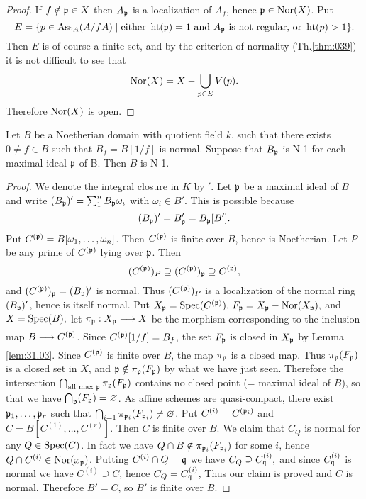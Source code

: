 \documentclass[../main]{subfiles}
\begin{document}
\begin{proof}
If $f \notin \mathfrak{p} \in X$ then $A_{\mathfrak{p}}$ is a localization of $A_{f}$, hence $\mathfrak{p} \in \operatorname{Nor}(X)$. Put \[E=\{p \in \operatorname{Ass}_{A}(A / f A) \mid \text{either }\operatorname{ht}(\mathfrak{p})=1\text{ and } A_{\mathfrak{p}}\text{ is not regular, or }\operatorname{ht}(p)>1\}.\] Then $E$ is of course a finite set, and by the criterion of normality (Th.\ref{thm:039}) it is not difficult to see that
\[
\operatorname{Nor}(X)=X-\bigcup_{p \in E} V(p) .
\]
Therefore $\operatorname{Nor}(X)$ is open.
\end{proof}
\begin{lemma}\label{lem:31.04} Let $B$ be a Noetherian domain with quotient field $k$, such that there exists $0 \neq f \in B$ such that $B_{f}=B[1 / f]$ is normal. Suppose that $B_{\mathfrak{p}}$ is N-1 for each maximal ideal $\mathfrak{p}$ of B. Then $B$ is N-1.\end{lemma}
\begin{proof}
We denote the integral closure in $K$ by $'$. Let $\mathfrak{p}$ be a maximal ideal of $B$ and write $(B_{\mathfrak{p}})'=\sum_{1}^{n} B_{\mathfrak{p}}\omega_{i}$ with $\omega_{i} \in B'$. This is possible because \[(B_{\mathfrak{p}})'=B'_{\mathfrak{p}}=B_{\mathfrak{p}}[B'].\] Put $C^{(\mathfrak{p})}=B[\omega_{1}, \dots, \omega_{n}]$. Then $C^{(\mathfrak{p})}$ is finite over $B$, hence is Noetherian. Let $P$ be any prime of $C^{(\mathfrak{p})}$ lying over $\mathfrak{p}$. Then \[(C^{(\mathfrak{p})})_{P}\supseteq  (C^{(\mathfrak{p})})_{\mathfrak{p}} \supseteq C^{(\mathfrak{p})},\] and $(C^{(\mathfrak{p})})_{\mathfrak{p}}=(B_{\mathfrak{p}})'$ is normal. Thus $(C^{(\mathfrak{p})})_{P}$ is a localization of the normal ring $(B_{\mathfrak{p}})'$, hence is itself normal. Put $X_{\mathfrak{p}}=\operatorname{Spec}(C^{(\mathfrak{p})}),\, F_{\mathfrak{p}}=X_{\mathfrak{p}}-\operatorname{Nor}(X_{\mathfrak{p}}),$ and $X=\operatorname{Spec}(B) ;$ let $\pi_\ideal{p}: X_\ideal{p} \varrightarrow{} X$ be the morphism corresponding to the inclusion map $B \varrightarrow{} C^{(\ideal{p})}$. Since $C^{(\mathfrak{p})}[1 / f]=B_{f}$, the set $F_{\mathfrak{p}}$ is closed in $X_{\mathfrak{p}}$ by Lemma \ref{lem:31.03}. Since $C^{(\mathfrak{p})}$ is finite over $B$, the map $\pi_{\mathfrak{p}}$ is a closed map. Thus $\pi_{\mathfrak{p}}(F_{\mathfrak{p}})$ is a closed set in $X$, and $\mathfrak{p} \notin \pi_{\mathfrak{p}}(F_{\mathfrak{p}})$ by what we have just seen. Therefore the intersection $ \bigcap_{\text{all max } \mathfrak{p}}\pi_{\mathfrak{p}}(F_{\mathfrak{p}})$ contains no closed point (= maximal ideal of $B$), so that we have $\bigcap_{\mathfrak{p}}(F_{\mathfrak{p}})=\varnothing$. As affine schemes are quasi-compact, there exist $\mathfrak{p}_{1}, \dots, \mathfrak{p}_{r}$ such that $\bigcap_{i=1} \pi_{\mathfrak{p}_i}(F_{\mathfrak{p}_{i}}) \neq \varnothing$. Put $C^{(i)}=C^{(\mathfrak{p}_{i})}$ and $C=B[C^{(1)}, \ldots, C^{(r)}]$. Then $C$ is finite over $B$.
We claim that $C_{Q}$ is normal for any $Q \in\operatorname{Spec}(C)$. In fact we have $Q \cap B \notin \pi_{\mathfrak{p}_i}(F_{\mathfrak{p}_i})$ for some $i$, hence $Q \cap C^{(i)} \in \operatorname{Nor}(x_{\mathfrak{p}})$. Putting $C^{(i)} \cap Q=\mathfrak{q}$ we have $C_Q \supseteq C^{(i)}_{\mathfrak{q}},$ and since $C^{(i)}_{\mathfrak{q}}$ is
normal we have $C^{(i)} \supseteq C$, hence $C_{Q}=C^{(i)}_{\mathfrak{q}}$, Thus our claim is proved and $C$ is normal. Therefore $B'=C$, so $B'$ is finite over $B$.\end{proof}
\end{document}
